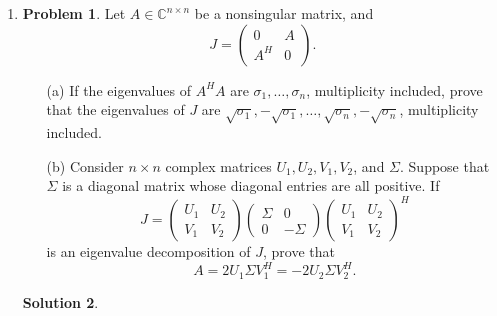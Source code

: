 \documentclass[12pt]{article}
\theoremstyle{definition}
\newtheorem*{solution}{\normalfont\textbf{Solution}}
\newtheorem*{Problem}{\noindent\textbf{Problem}}
\begin{document}
\begin{enumerate}[leftmargin=*]
\begin{solution}
\begin{proof}
                Thus,

                $$
                \frac{\|I_n - X^H X\|_F}{\text{dist}(X, \mathcal{S})}
                \geq \frac{\|I_n - X^H X\|_F}{\|I_n - \Sigma\|_F} 
                = \frac{\sqrt{n} |1 -
                \sigma^2|}{\sqrt{n} |1 - \sigma|} = |1+\sigma|.
                $$

                Take \( \sigma \to +\infty \), this ratio is unbounded.
            \end{proof}
        \end{solution}
    
    \item \begin{Problem}
            Let \( A \in \mathbb{C}^{n \times n} \) be a nonsingular matrix, and
            \[
            J = \begin{pmatrix} 0 & A \\ A^H & 0 \end{pmatrix}.
            \]
            \begin{enumerate}
                \item[(a)] If the eigenvalues of \( A^H A \) are \( \sigma_1, \ldots, \sigma_n \), multiplicity included, prove that the eigenvalues of \( J \) are \( \sqrt{\sigma_1}, -\sqrt{\sigma_1}, \ldots, \sqrt{\sigma_n}, -\sqrt{\sigma_n} \), multiplicity included.
                \item[(b)] Consider \( n \times n \) complex matrices \( U_1, U_2, V_1, V_2 \), and \( \Sigma \). Suppose that \( \Sigma \) is a diagonal matrix whose diagonal entries are all positive. If
                \[
                J = \begin{pmatrix} U_1 & U_2 \\ V_1 & V_2 \end{pmatrix} \begin{pmatrix} \Sigma & 0 \\ 0 & -\Sigma \end{pmatrix} \begin{pmatrix} U_1 & U_2 \\ V_1 & V_2 \end{pmatrix}^H
                \]
                is an eigenvalue decomposition of \( J \), prove that
                \[
                A = 2 U_1 \Sigma V_1^H = -2 U_2 \Sigma V_2^H.
                \]
            \end{enumerate}
        \end{Problem}
        \begin{solution}

\end{solution}
\end{enumerate}
\end{document}
